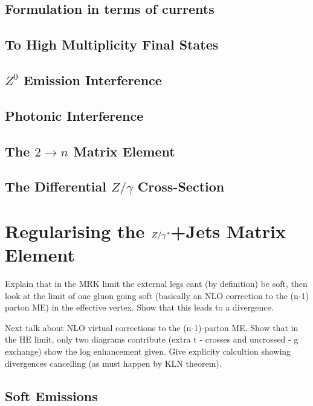 	\subsection{Formulation in terms of currents}

	\subsection{To High Multiplicity Final States}

	\subsection{$Z^0$ Emission Interference}

	\subsection{Photonic Interference}

	\subsection{The $2\rightarrow n$ Matrix Element}

	\subsection{The Differential ${Z/\gamma}$ Cross-Section}

\section{Regularising the $Z/\gamma^*$+Jets Matrix Element}
	\label{sec:regularising}

	Explain that in the MRK limit the external legs cant (by definition) be soft, then look at the limit
	of one gluon going soft (basically an NLO correction to the (n-1) parton ME) in the effective vertex.
	Show that this leads to a divergence.

	Next talk about NLO virtual corrections to the (n-1)-parton ME.  Show that in the HE limit, only two
	diagrams contribute (extra t - crosses and uncrossed - g exchange) show the log enhancement given.
	Give explicity calcultion showing divergences cancelling (as must happen by KLN theorem).

	\subsection{Soft Emissions}
	\label{sub:softEmissions}

